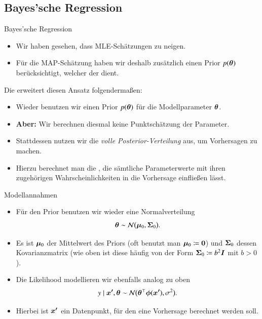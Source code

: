 \subsection{Bayes'sche Regression}

\begin{frame}{Bayes'sche Regression}{}
	\begin{itemize}
		\item Wir haben gesehen, dass MLE-Schätzungen zu  neigen.
		\item Für die MAP-Schätzung haben wir deshalb zusätzlich einen Prior $p(\bm{\theta})$ berücksichtigt,
			welcher der  dient.
	\end{itemize}
	
	\begin{boxGray}
		Die  erweitert diesen Ansatz folgendermaßen:

		\begin{itemize}
			\item Wieder benutzen wir einen Prior $p(\bm{\theta})$ für die Modellparameter $\bm{\theta}$.
			\item \textbf{Aber:} Wir berechnen diesmal keine Punktschätzung der Parameter.
			\item Stattdessen nutzen wir die \textit{volle Posterior-Verteilung} aus, um Vorhersagen zu machen.
			\item Hierzu berechnet man die , die sämtliche Parameterwerte mit
				ihren zugehörigen Wahrscheinlichkeiten in die Vorhersage einfließen lässt.
		\end{itemize}
	\end{boxGray}
\end{frame}


\begin{frame}{Modellannahmen}{}
	\begin{itemize}
		\item Für den Prior benutzen wir wieder eine Normalverteilung
		\begin{equation}
			\bm{\theta} \sim \mathcal{N}\bigl( \bm{\mu}_0, \bm{\Sigma}_0 \bigr).
		\end{equation}
		\item Es ist $\bm{\mu}_0$ der Mittelwert des Priors (oft benutzt man $\bm{\mu}_0 \coloneqq \bm{0}$) und $\bm{\Sigma}_0$ dessen Kovarianzmatrix
			(wie oben ist diese häufig von der Form $\bm{\Sigma}_0 \coloneqq b^2 \bm{I}$ mit $b > 0$).
		\item Die Likelihood modellieren wir ebenfalls analog zu oben
		\begin{equation}
			y \mid \bm{x'}, \bm{\theta} \sim \mathcal{N}\bigl( \bm{\theta}^\top \bm{\phi}(\bm{x'}), \sigma^2 \bigr).
		\end{equation}
		\item Hierbei ist $\bm{x'}$ ein Datenpunkt, für den eine Vorhersage berechnet werden soll.
	\end{itemize}
\end{frame}


